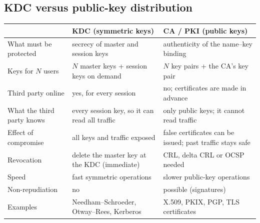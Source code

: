 \subsection{KDC versus public-key distribution \new}
\noindent\begin{minipage}{\textwidth}
\begin{center}\small
\begin{tabularx}{\textwidth}{@{}l>{\raggedright\arraybackslash}X>{\raggedright\arraybackslash}X@{}}
\toprule
 & KDC (symmetric keys) & CA / PKI (public keys)\\
\midrule
What must be protected & secrecy of master and session keys & authenticity of the name--key binding\\
Keys for $N$ users & $N$ master keys + session keys on demand & $N$ key pairs + the CA's key pair\\
Third party online & yes, for every session & no; certificates are made in advance\\
What the third party knows & every session key, so it can read all traffic & only public keys; it cannot read traffic\\
Effect of compromise & all keys and traffic exposed & false certificates can be issued; past traffic stays safe\\
Revocation & delete the master key at the KDC (immediate) & CRL, delta CRL or OCSP needed\\
Speed & fast symmetric operations & slower public-key operations\\
Non-repudiation & no & possible (signatures)\\
Examples & Needham--Schroeder, Otway--Rees, Kerberos & X.509, PKIX, PGP, TLS certificates\\
\bottomrule
\end{tabularx}
\end{center}
\end{minipage}

